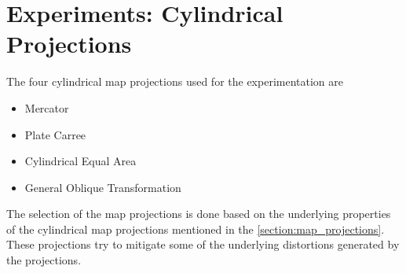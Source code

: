 
\section{Experiments: Cylindrical Projections}

The four cylindrical map projections used for the experimentation are
\begin{itemize}
    \item Mercator
    \item Plate Carree
    \item Cylindrical Equal Area
    \item General Oblique Transformation
\end{itemize}
The selection of the map projections is done based on the underlying properties of the cylindrical map projections mentioned in the \autoref{section:map_projections}. These projections try to mitigate some of the underlying distortions generated by the projections.

